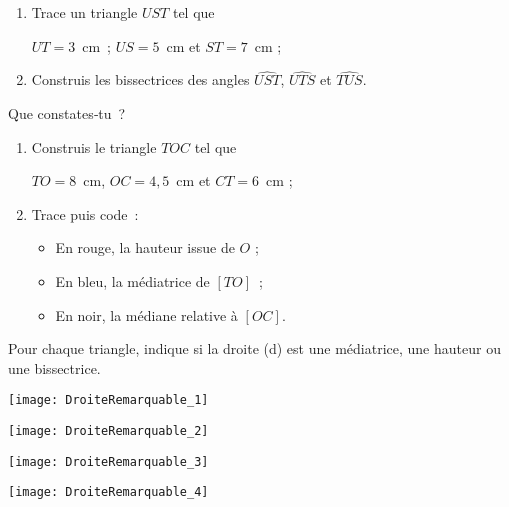 \begin{exercice}
\begin{enumerate}
 \item Trace un triangle $UST$ tel que 
 
 $UT = 3$ cm ; $US = 5$ cm et $ST = 7$ cm ;
 \item Construis les bissectrices des angles $\widehat{UST}$, $\widehat{UTS}$ et $\widehat{TUS}$.
 \end{enumerate}
 \vspace{-0.3cm}
Que constates‑tu ?
\end{exercice}


\begin{exercice}
\begin{enumerate}
 \item Construis le triangle $TOC$ tel que 
 
 $TO = 8$ cm, $OC = 4,5$ cm et $CT = 6$ cm ;
 \item Trace puis code :
  \begin{itemize}
   \item En rouge, la hauteur issue de $O$ ;
   \item En bleu, la médiatrice de $[TO]$ ;
   \item En noir, la médiane relative à $[OC]$.
   \end{itemize} 
 \end{enumerate}
\end{exercice}

\begin{exercice}
Pour chaque triangle, indique si la droite (d) est une médiatrice, une hauteur ou une bissectrice.
 \begin{colenumerate}{2}
 \item

 \texttt{[image: DroiteRemarquable\_1]}

 \dotfill
 \item
 
 \texttt{[image: DroiteRemarquable\_2]}

 \dotfill
 \item
 
 \texttt{[image: DroiteRemarquable\_3]}

 \dotfill
 \item
 
 \texttt{[image: DroiteRemarquable\_4]}

 \dotfill

 \end{colenumerate}

\end{exercice}


